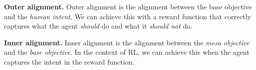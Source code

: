\documentclass[12pt,A4]{report}
\newcommand{\autobaj}{}
\theoremstyle{definition}
\begin{document}

\begin{displayquote} 
\textbf{Outer alignment.} 
  Outer alignment is the alignment between the base objective and the \textit{human intent}. We can achieve this with a reward function that correctly captures what the agent \textit{should} do and what it \textit{should not} do.
\end{displayquote} 

\begin{displayquote} 
  \textbf{Inner alignment.} 
Inner alignment is the alignment between the \textit{mesa objective} and the \textit{base objective}. In the context of RL, we can achieve this when the agent captures the intent in the reward function.
\end{displayquote} 







\end{document}
